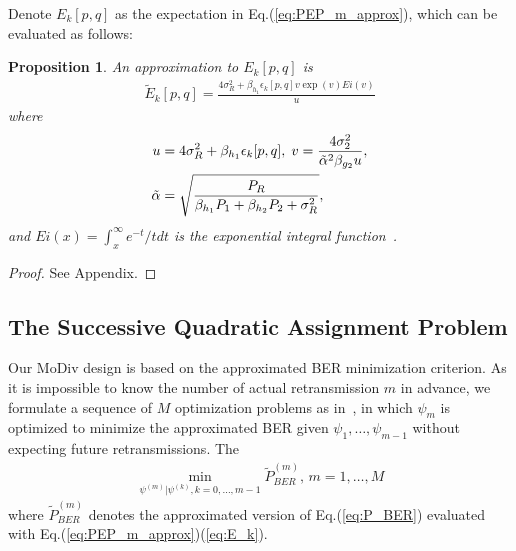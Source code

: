 \documentclass[journal]{IEEEtran}
\newtheorem{proposition}{Proposition}
\begin{document}
Denote $E_k[p,q]$ as the expectation in Eq.(\ref{eq:PEP_m_approx}), which can be
evaluated as follows:
\begin{proposition}
  An approximation to $E_k[p,q]$ is
  \begin{align}
    \tilde{E}_k[p,q] = \frac{4\sigma_R^2
    + \beta_{h_1}\epsilon_k[p,q]v\exp(v)Ei(v)}{u}
    \label{eq:E_k}
  \end{align}
  where
  \begin{subequations}
    \begin{align}
      u & = 4\sigma_R^2 + \beta_{h_1}\epsilon_k[p,q],\;
      v =
      \frac{4\sigma_2^2}{\tilde{\alpha}^2\beta_{g_2}u}, \notag\\
      \tilde{\alpha} & = \sqrt{\frac{P_R}{\beta_{h_1}P_1 +
      \beta_{h_2}P_2+\sigma_R^2}}, \notag
    \end{align}
  \end{subequations}
  and $Ei(x) = \int_x^\infty e^{-t}/tdt$ is the exponential integral
  function~\cite{zwillinger2014table}. 
  \label{prop:E_k}
\end{proposition}
\begin{proof}
  See Appendix.
\end{proof}

\subsection{The Successive Quadratic Assignment Problem}
\label{ssec:qap}
Our MoDiv design is based on the approximated BER minimization criterion. As it
is impossible to know the number of actual retransmission $m$ in advance, we
formulate a sequence of $M$ optimization problems as
in~\cite{harvind2005symbol}, in which $\psi_m$ is optimized to minimize the
approximated BER given $\psi_1,\ldots,\psi_{m-1}$ without expecting future retransmissions. The
\begin{align}
  \min_{\psi^{(m)}|\psi^{(k)},k=0,\ldots,m-1}\tilde{P}_{BER}^{(m)},\,m=1,\ldots,M
  \label{eq:core}
\end{align}
where $\tilde{P}_{BER}^{(m)}$ denotes the approximated version of
Eq.(\ref{eq:P_BER}) evaluated with Eq.(\ref{eq:PEP_m_approx})(\ref{eq:E_k}).
\end{document}
